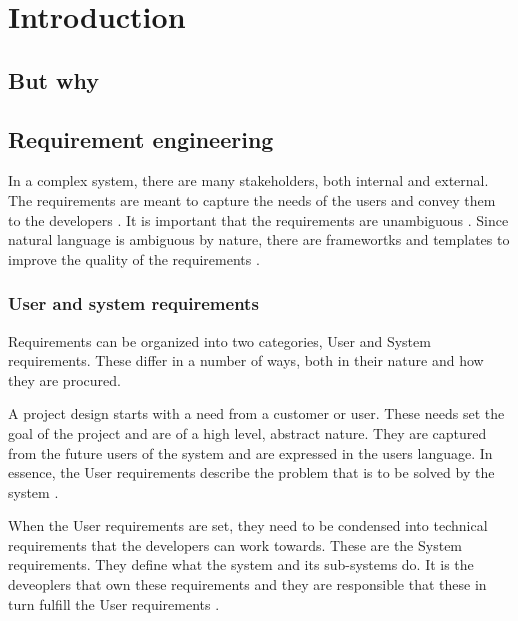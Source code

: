 \chapter{Introduction}
\section{But why}
\section{Requirement engineering}
In a complex system, there are many stakeholders, both internal and external.
The requirements are meant to capture the needs of the users and convey them to
the developers \cite{ibm_req}. It is important that the requirements are
unambiguous \cite{ibm_req, rupp2014}. Since natural language is ambiguous by
nature, there are framewortks and templates to improve the quality of the
requirements \cite{rupp2014}. 

\subsection{User and system requirements}
Requirements can be organized into two categories, User and System requirements.
These differ in a number of ways, both in their nature and how they are
procured.

A project design starts with a need from a customer or user. These needs set the
goal of the project and are of a high level, abstract nature. They are captured
from the future users of the system and are expressed in the users language. In
essence, the User requirements describe the problem that is to be solved by the
system \cite{ibm_req}. 

When the User requirements are set, they need to be condensed into technical
requirements that the developers can work towards. These are the System
requirements. They define what the system and its sub-systems do. It is the
deveoplers that own these requirements and they are responsible that these in
turn fulfill the User requirements \cite{ibm_req}.

